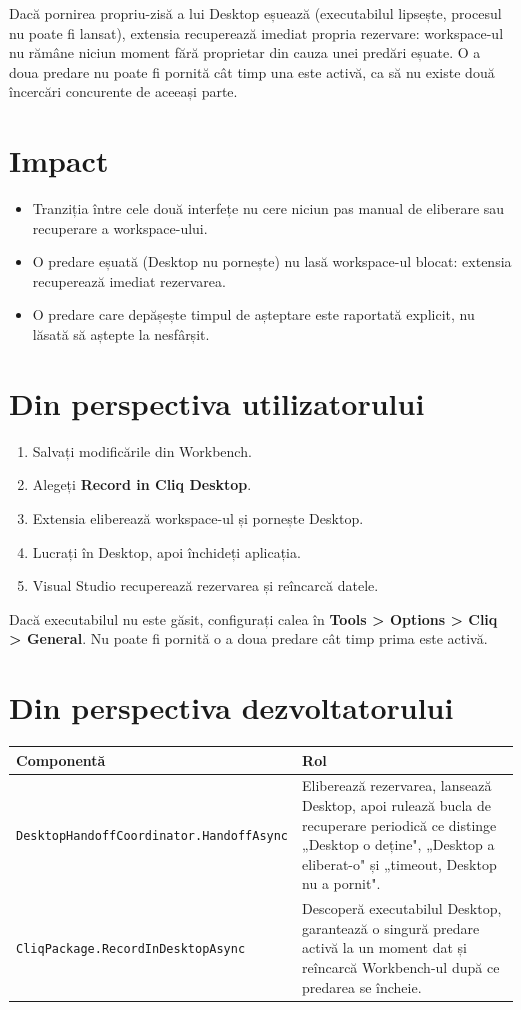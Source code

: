 \documentclass[12pt,a4paper]{report}
\newcommand{\UI}[1]{\textbf{#1}}
\newcommand{\File}[1]{\nolinkurl{#1}}
\begin{document}
Dacă pornirea propriu-zisă a lui Desktop eșuează (executabilul lipsește, procesul nu poate fi lansat), extensia recuperează imediat propria rezervare: workspace-ul nu rămâne niciun moment fără proprietar din cauza unei predări eșuate. O a doua predare nu poate fi pornită cât timp una este activă, ca să nu existe două încercări concurente de aceeași parte.

\section{Impact}

\begin{itemize}
  \item Tranziția între cele două interfețe nu cere niciun pas manual de eliberare sau recuperare a workspace-ului.
  \item O predare eșuată (Desktop nu pornește) nu lasă workspace-ul blocat: extensia recuperează imediat rezervarea.
  \item O predare care depășește timpul de așteptare este raportată explicit, nu lăsată să aștepte la nesfârșit.
\end{itemize}

\section{Din perspectiva utilizatorului}

\begin{enumerate}
  \item Salvați modificările din Workbench.
  \item Alegeți \UI{Record in Cliq Desktop}.
  \item Extensia eliberează workspace-ul și pornește Desktop.
  \item Lucrați în Desktop, apoi închideți aplicația.
  \item Visual Studio recuperează rezervarea și reîncarcă datele.
\end{enumerate}

Dacă executabilul nu este găsit, configurați calea în \UI{Tools > Options > Cliq > General}. Nu poate fi pornită o a doua predare cât timp prima este activă.

\section{Din perspectiva dezvoltatorului}

\begin{tabularx}{\textwidth}{@{}p{5.3cm}Y@{}}
\toprule \textbf{Componentă} & \textbf{Rol} \\
\midrule
\File{DesktopHandoffCoordinator.HandoffAsync} & Eliberează rezervarea, lansează Desktop, apoi rulează bucla de recuperare periodică ce distinge „Desktop o deține", „Desktop a eliberat-o" și „timeout, Desktop nu a pornit". \\
\File{CliqPackage.RecordInDesktopAsync} & Descoperă executabilul Desktop, garantează o singură predare activă la un moment dat și reîncarcă Workbench-ul după ce predarea se încheie. \\
\bottomrule
\end{tabularx}
\end{document}
